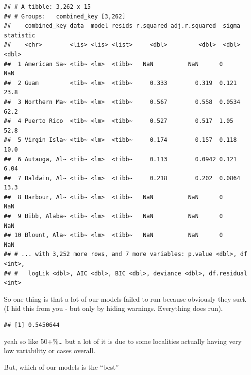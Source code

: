 \documentclass[
]{article}
\newenvironment{Shaded}{\begin{snugshade}}{\end{snugshade}}
\newcommand{\DecValTok}[1]{\textcolor[rgb]{0.00,0.00,0.81}{#1}}
\newcommand{\KeywordTok}[1]{\textcolor[rgb]{0.13,0.29,0.53}{\textbf{#1}}}
\newcommand{\NormalTok}[1]{#1}
\newcommand{\OperatorTok}[1]{\textcolor[rgb]{0.81,0.36,0.00}{\textbf{#1}}}
\newcommand{\StringTok}[1]{\textcolor[rgb]{0.31,0.60,0.02}{#1}}
\begin{document}
\begin{verbatim}
## # A tibble: 3,262 x 15
## # Groups:   combined_key [3,262]
##    combined_key data  model resids r.squared adj.r.squared  sigma statistic
##    <chr>        <lis> <lis> <list>     <dbl>         <dbl>  <dbl>     <dbl>
##  1 American Sa~ <tib~ <lm>  <tibb~   NaN          NaN      0         NaN   
##  2 Guam         <tib~ <lm>  <tibb~     0.333        0.319  0.121      23.8 
##  3 Northern Ma~ <tib~ <lm>  <tibb~     0.567        0.558  0.0534     62.2 
##  4 Puerto Rico  <tib~ <lm>  <tibb~     0.527        0.517  1.05       52.8 
##  5 Virgin Isla~ <tib~ <lm>  <tibb~     0.174        0.157  0.118      10.0 
##  6 Autauga, Al~ <tib~ <lm>  <tibb~     0.113        0.0942 0.121       6.04
##  7 Baldwin, Al~ <tib~ <lm>  <tibb~     0.218        0.202  0.0864     13.3 
##  8 Barbour, Al~ <tib~ <lm>  <tibb~   NaN          NaN      0         NaN   
##  9 Bibb, Alaba~ <tib~ <lm>  <tibb~   NaN          NaN      0         NaN   
## 10 Blount, Ala~ <tib~ <lm>  <tibb~   NaN          NaN      0         NaN   
## # ... with 3,252 more rows, and 7 more variables: p.value <dbl>, df <int>,
## #   logLik <dbl>, AIC <dbl>, BIC <dbl>, deviance <dbl>, df.residual <int>
\end{verbatim}

So one thing is that a lot of our models failed to run because obviously
they suck (I hid this from you - but only by hiding warnings. Everything
does run).

\begin{Shaded}
\end{Shaded}

\begin{verbatim}
## [1] 0.5450644
\end{verbatim}

yeah so like 50+\%\ldots{} but a lot of it is due to some localities
actually having very low variability or cases overall.

But, which of our models is the ``best''

\begin{Shaded}
\end{Shaded}
\end{document}
